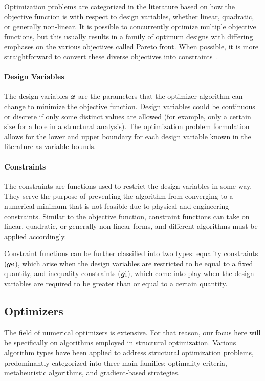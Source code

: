 Optimization problems are categorized in the literature based on how the objective function is with respect to design variables, whether linear, quadratic, or generally non-linear. It is possible to concurrently optimize multiple objective functions, but this usually results in a family of optimum designs with differing emphases on the various objectives called Pareto front. When possible, it is more straightforward to convert these diverse objectives into constraints~.

\paragraph{Design Variables}
The design variables $\bm{x}$ are the parameters that the optimizer algorithm can change to minimize the objective function. Design variables could be continuous or discrete if only some distinct values are allowed (for example, only a certain size for a hole in a structural analysis). The optimization problem formulation allows for the lower and upper boundary for each design variable known in the literature as variable bounds.

\paragraph{Constraints}
The constraints are functions used to restrict the design variables in some way. They serve the purpose of preventing the algorithm from converging to a numerical minimum that is not feasible due to physical and engineering constraints. Similar to the objective function, constraint functions can take on linear, quadratic, or generally non-linear forms, and different algorithms must be applied accordingly.

Constraint functions can be further classified into two types: equality constraints ($\bm{g}\text{e}$), which arise when the design variables are restricted to be equal to a fixed quantity, and inequality constraints ($\bm{g}\text{i}$), which come into play when the design variables are required to be greater than or equal to a certain quantity.

\subsection{Optimizers}
The field of numerical optimizers is extensive. For that reason, our focus here will be specifically on algorithms employed in structural optimization. Various algorithm types have been applied to address structural optimization problems, predominantly categorized into three main families: optimality criteria, metaheuristic algorithms, and gradient-based strategies.

